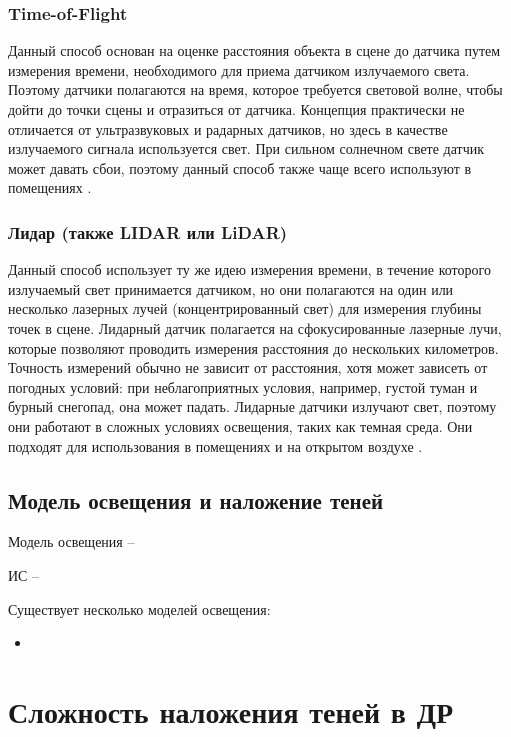\subsubsection*{Time-of-Flight}

Данный способ основан на оценке расстояния объекта в сцене до датчика путем измерения времени, необходимого для приема датчиком излучаемого света. Поэтому датчики полагаются на время, которое требуется световой волне, чтобы дойти до точки сцены и отразиться от датчика. Концепция практически не отличается от ультразвуковых и радарных датчиков, но здесь в качестве излучаемого сигнала используется свет. При сильном солнечном свете датчик может давать сбои, поэтому данный способ также чаще всего используют в помещениях \cite{rgbd}.

\subsubsection*{Лидар (также LIDAR или LiDAR)}

Данный способ использует ту же идею измерения времени, в течение которого излучаемый свет принимается датчиком, но они полагаются на один или несколько лазерных лучей (концентрированный свет) для измерения глубины точек в сцене. Лидарный датчик полагается на сфокусированные лазерные лучи, которые позволяют проводить измерения расстояния до нескольких километров. Точность измерений обычно не зависит от расстояния, хотя может зависеть от погодных условий: при неблагоприятных условия, например, густой туман и бурный снегопад, она может падать. Лидарные датчики излучают свет, поэтому они работают в сложных условиях освещения, таких как темная среда. Они подходят для использования в помещениях и на открытом воздухе \cite{rgbd}.

\subsection{Модель освещения и наложение теней}


Модель освещения -- 

ИС -- 

Существует несколько моделей освещения:

\begin{itemize}
	\item 
\end{itemize}


\section{Сложность наложения теней в ДР}

